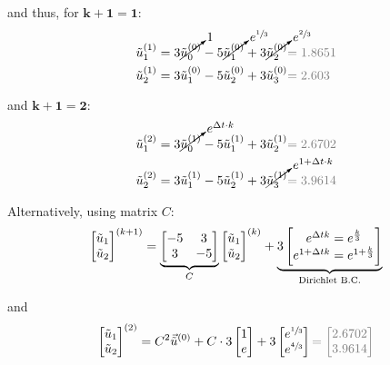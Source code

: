 and thus, for $\mathbf{k+1=1}$:
\begin{align*}
	\utild_1^{(1)} & = 3\cancelto{1}{\utild_0^{(0)}} - 5\cancelto{e^{\sfrac{1}{3}}}{\utild_1^{(0)}} + 3\cancelto{e^{\sfrac{2}{3}}}{\utild_2^{(0)}} {\color{gray} = 1.8651} \\
	\utild_2^{(1)} & = 3\utild_1^{(0)} - 5\utild_2^{(0)} + 3\utild_3^{(0)} {\color{gray} = 2.603}
\end{align*}

and $\mathbf{k+1 = 2}$:
\begin{align*}
	\utild_1^{(2)} & = 3\cancelto{e^{\Delta t\cdot k}}{\utild_0^{(1)}} - 5\utild_1^{(1)} + 3\utild_2^{(1)} {\color{gray} = 2.6702} \\
	\utild_2^{(2)} & = 3\utild_1^{(1)} - 5\utild_2^{(1)} + 3\cancelto{e^{1+\Delta t\cdot k}}{\utild_3^{(1)}} {\color{gray} = 3.9614}
\end{align*}

Alternatively, using matrix $C$:
\begin{align*}
	\begin{bmatrix}
		\tilde{u}_1 \\
		\tilde{u}_2
	\end{bmatrix}^{(k+1)}
	=
	\underbrace{
		\begin{bmatrix}
			-5 & 3 \\
			3 & -5
		\end{bmatrix}
	}_{C}
	\begin{bmatrix}
		\tilde{u}_1 \\
		\tilde{u}_2
	\end{bmatrix}^{(k)}
	+
	\underbrace{
		3\begin{bmatrix}
			e^{\Delta t k} = e^\frac{k}{3} \\
			e^{1+\Delta t k} = e^{1+\frac{k}{3}}
		\end{bmatrix}
	}_\text{Dirichlet B.C.}
\end{align*}

and
\begin{align*}
	\begin{bmatrix}
		\utild_1 \\
		\utild_2
	\end{bmatrix}^{(2)}
	=
	C^2\vec{\utild}^{(0)} + C\cdot 3\begin{bmatrix}
		1 \\
		e
	\end{bmatrix}
	+
	3\begin{bmatrix}
		e^{\sfrac{1}{3}} \\
		e^{\sfrac{4}{3}}
	\end{bmatrix}
	{\color{gray}
		=
		\begin{bmatrix}
			2.6702 \\
			3.9614
		\end{bmatrix}
	}
\end{align*}

